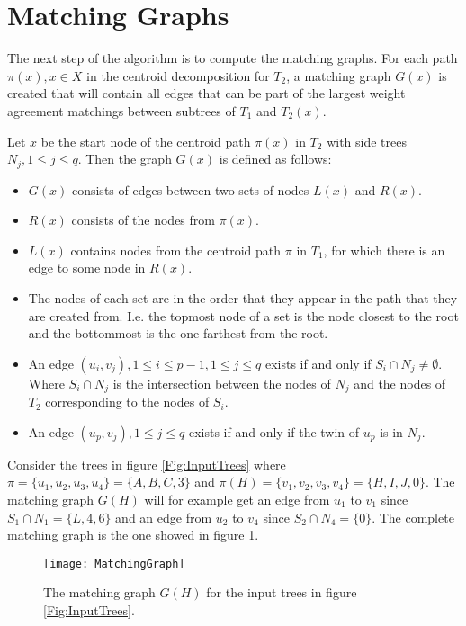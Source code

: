 \section{Matching Graphs}
The next step of the algorithm is to compute the matching graphs. For each path $\pi(x), x \in X$ in the centroid decomposition for $T_2$, a matching graph $G(x)$ is created that will contain all edges that can be part of the largest weight agreement matchings between subtrees of $T_1$ and $T_2(x)$.

Let $x$ be the start node of the centroid path $\pi(x)$ in $T_2$ with side trees $N_j, 1 \le j \le q$. Then the graph $G(x)$ is defined as follows:

\begin{itemize}
	\item $G(x)$ consists of edges between two sets of nodes $L(x)$ and $R(x)$.
	\item $R(x)$ consists of the nodes from $\pi(x)$.
	\item $L(x)$ contains nodes from the centroid path $\pi$ in $T_1$, for which there is an edge to some node in $R(x)$.
	\item The nodes of each set are in the order that they appear in the path that they are created from. I.e. the topmost node of a set is the node closest to the root and the bottommost is the one farthest from the root.
	\item An edge $(u_i, v_j), 1 \le i \le p-1, 1 \le j \le q$ exists if and only if $S_i \cap N_j \ne \emptyset$.
	\subitem Where $S_i \cap N_j$ is the intersection between the nodes of $N_j$ and the nodes of $T_2$ corresponding to the nodes of $S_i$.
	\item An edge $(u_p, v_j), 1 \le j \le q$ exists if and only if the twin of $u_p$ is in $N_j$.
\end{itemize}

Consider the trees in figure \ref{Fig:InputTrees} where $\pi = \{u_1,u_2,u_3,u_4\} = \{A,B,C,3\}$ and $\pi(H) = \{v_1,v_2,v_3,v_4\} = \{H,I,J,0\}$. The matching graph $G(H)$ will for example get an edge from $u_1$ to $v_1$ since $S_1 \cap N_1 = \{L,4,6\}$ and an edge from $u_2$ to $v_4$ since $S_2 \cap N_4 = \{0\}$. The complete matching graph is the one showed in figure \ref{matchingGraphFigure}.

\begin{figure}
	\texttt{[image: MatchingGraph]}
	\caption{The matching graph $G(H)$ for the input trees in figure \ref{Fig:InputTrees}.}
	\label{matchingGraphFigure}
\end{figure}

